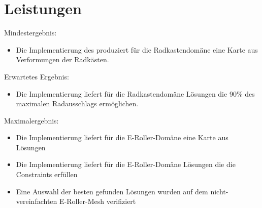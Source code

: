 \documentclass[12pt]{article}
\begin{document}
\section{Leistungen}
Mindestergebnis:
\begin{itemize}  
\item Die Implementierung des produziert für die Radkastendomäne eine Karte aus Verformungen der Radkästen.
\end{itemize}
Erwartetes Ergebnis:
\begin{itemize}  
\item  Die Implementierung liefert für die Radkastendomäne Lösungen die 90\% des maximalen Radausschlags ermöglichen.
\end{itemize}
Maximalergebnis:
\begin{itemize}  
\item Die Implementierung liefert für die E-Roller-Domäne eine Karte aus Lösungen
\item Die Implementierung liefert für die E-Roller-Domäne Lösungen die die Constraints erfüllen
\item Eine Auswahl der besten gefunden Lösungen wurden auf dem nicht-vereinfachten E-Roller-Mesh verifiziert
\end{itemize}

\newpage{}

\end{document}
